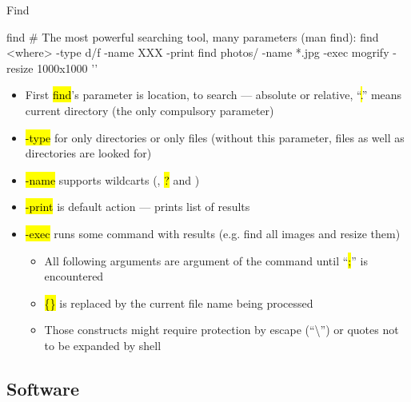 \documentclass[compress, ucs, xelatex, 11pt, xcolor=svgnames,
  hyperref={
    bookmarks=true,
    unicode=true,
    colorlinks=true,
    pdftitle={Linux, command line and MetaCentrum},
    plainpages=false,
    pdfauthor={Vojtech Zeisek},
    pdfsubject={Course about use of Linux command line, writing shell scripts and using MetaCentrum of CESNET},
    pdfcreator={XeLaTeX, http://www.xelatex.org/},
    pdfkeywords={Linux, GNU, BASH, shell, command line, MetaCentrum},
    linkcolor=Sienna,
    anchorcolor=black,
    citecolor=green,
    filecolor=magenta,
    menucolor=Sienna,
    urlcolor=cyan,
    pdftex},
  url={hyphens, lowtilde} %
  ]{beamer}
\renewcommand{\texttt}[1]{\hl{\ttfamily #1}}
\begin{document}
\begin{frame}[fragile]{Find}
  \begin{bashcode}
    find # The most powerful searching tool, many parameters (man find):
    find <where> -type d/f -name XXX -print
    find photos/ -name *.jpg -exec mogrify -resize 1000x1000 '{}' \;
  \end{bashcode}
  \begin{itemize}
    \item First \texttt{find}'s parameter is location, to search --- absolute or relative, ``\texttt{.}'' means current directory (the only compulsory parameter)
    \item \texttt{-type} for only directories or only files (without this parameter, files as well as directories are looked for)
    \item \texttt{-name} supports wildcarts (\texttt{*}, \texttt{?} and \texttt{[\ldots]})
    \item \texttt{-print} is default action --- prints list of results
    \item \texttt{-exec} runs some command with results (e.g. find all images and resize them)
    \begin{itemize}
      \item All following arguments are argument of the command until ``\texttt{;}'' is encountered
      \item \texttt{\{\}} is replaced by the current file name being processed
      \item Those constructs might require protection by escape (``\textbackslash'') or quotes not to be expanded by shell
    \end{itemize}
  \end{itemize}
\end{frame}

\subsection{Software}
\end{document}
